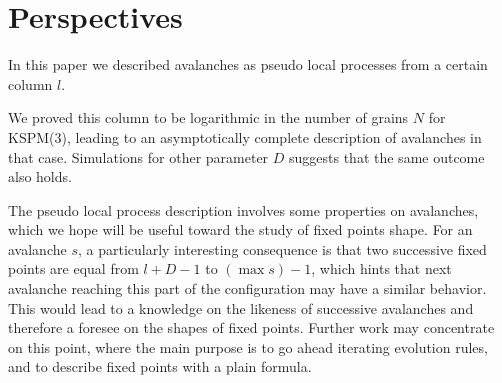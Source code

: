 \documentclass[11pt,a4paper]{llncs}
\begin{document}
\section{Perspectives}

In this paper we described avalanches as pseudo local processes from a certain column $l$.

We proved this column to be logarithmic in the number of grains $N$ for KSPM(3), leading to an asymptotically complete description of avalanches in that case. Simulations for other parameter $D$ suggests that the same outcome also holds.

The pseudo local process description involves some properties on avalanches, which we hope will be useful toward the study of fixed points shape. For an avalanche $s$, a particularly interesting consequence is that two successive fixed points are equal from $l+D-1$ to $(\max s) -1$, which hints that next avalanche reaching this part of the configuration may have a similar behavior. This would lead to a knowledge on the likeness of successive avalanches and therefore a foresee on the shapes of fixed points. Further work may concentrate on this point, where the main purpose is to go ahead iterating evolution rules, and to describe fixed points with a plain formula.



\end{document}
